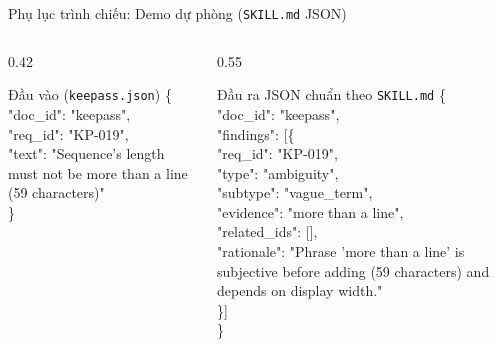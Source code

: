 \documentclass[aspectratio=169,10pt]{beamer}
\begin{document}
\begin{frame}{Phụ lục trình chiếu: Demo dự phòng (\texttt{SKILL.md} JSON)}
  \begin{columns}[T]
    \begin{column}{0.42\textwidth}
      \begin{block}{Đầu vào (\texttt{keepass.json})}
        \ttfamily\scriptsize
        \{\\
        \hspace*{1em}"doc\_id": "keepass",\\
        \hspace*{1em}"req\_id": "KP-019",\\
        \hspace*{1em}"text": "Sequence's length must not be more than a line (59 characters)"\\
        \}
      \end{block}
    \end{column}
    \begin{column}{0.55\textwidth}
      \begin{block}{Đầu ra JSON chuẩn theo \texttt{SKILL.md}}
        \ttfamily\scriptsize
        \{\\
        \hspace*{1em}"doc\_id": "keepass",\\
        \hspace*{1em}"findings": [\{\\
        \hspace*{2em}"req\_id": "KP-019",\\
        \hspace*{2em}"type": "ambiguity",\\
        \hspace*{2em}"subtype": "vague\_term",\\
        \hspace*{2em}"evidence": "more than a line",\\
        \hspace*{2em}"related\_ids": [],\\
        \hspace*{2em}"rationale": "Phrase 'more than a line' is subjective before adding (59 characters) and depends on display width."\\
        \hspace*{1em}\}]\\
        \}
      \end{block}
    \end{column}
  \end{columns}
\end{frame}
\end{document}
